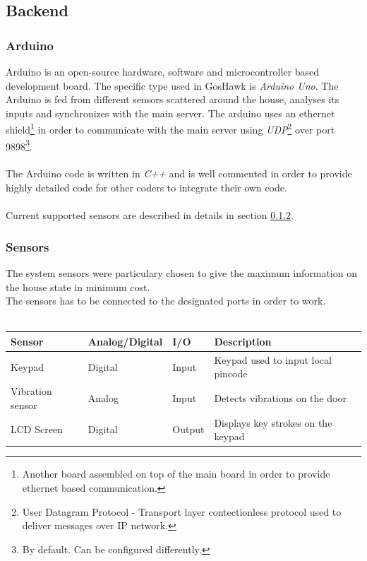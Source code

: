\documentclass[10pt]{article}
\begin{document}
\subsection{Backend}
\subsubsection{Arduino}
Arduino is an open-source hardware, software and microcontroller based development board.
The specific type used in GosHawk is \emph{Arduino Uno}.
The Arduino is fed from different sensors scattered around the house, analyses its inputs and synchronizes with the main server.
The arduino uses an ethernet shield\footnote{Another board assembled on top of the main board in order to provide ethernet based communication.} in order to communicate with the main server using \emph{UDP}\footnote{User Datagram Protocol - Transport layer contectionless protocol used to deliver messages over IP network.} over port 9898\footnote{By default. Can be configured differently.}.
\\ \\
\quad The Arduino code is written in \emph{C++} and is well commented in order to provide highly detailed code for other coders to integrate their own code.
\\ \\Current supported sensors are described in details in section \ref{ss_sensors}.

\subsubsection{Sensors} \label{ss_sensors}
The system sensors were particulary chosen to give the maximum information on the house state in minimum cost. \\
The sensors has to be connected to the designated ports in order to work. \\ \\
\begin{tabular}{| l | l | l | l |}
	\hline
	\textbf{Sensor} & \textbf{Analog/Digital} & \textbf{I/O} & \textbf{Description} \\ \hline
	Keypad & Digital & Input & Keypad used to input local pincode \\ \hline
	Vibration sensor & Analog & Input & Detects vibrations on the door \\ \hline
	LCD Screen & Digital & Output & Displays key strokes on the keypad \\ \hline

\end{tabular}
\end{document}
